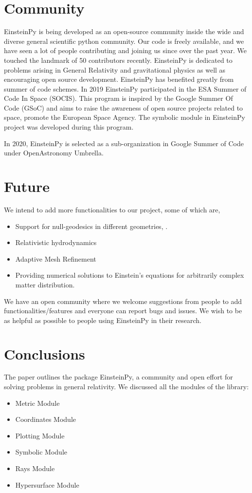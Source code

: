 \documentclass[onecolumn]{aa}
\begin{document}
\section{Community} \label{sec:COMMUNITY}
EinsteinPy is being developed as an open-source community inside the wide and diverse general scientific python community. Our code is freely available, and we have seen a lot of people contributing and joining us since over the past year. We touched the landmark of 50 contributors recently. EinsteinPy is dedicated to problems arising in General Relativity and gravitational physics as well as encouraging open source development. EinsteinPy has benefited greatly from summer of code schemes. In 2019 EinsteinPy participated in the ESA Summer of Code In Space (SOCIS). This program is inspired by the Google Summer Of Code (GSoC) and aims to raise the awareness of open source projects related to space, promote the European Space Agency. The symbolic module in EinsteinPy project was developed during this program.

In 2020, EinsteinPy is selected as a sub-organization in Google Summer of Code under OpenAstronomy Umbrella. 

\section{Future} \label{sec:FUTURE}
We intend to add more functionalities to our project, some of which are, 
\begin{itemize}
\item Support for null-geodesics in different geometries, . 
\item Relativistic hydrodynamics
\item Adaptive Mesh Refinement 
\item Providing numerical solutions to Einstein’s equations for arbitrarily complex matter distribution.
\end{itemize}

We have an open community where we welcome suggestions from people to add functionalities/features and everyone can report bugs and issues. We wish to be as helpful as possible to people using EinsteinPy in their research.


\section{Conclusions}
The paper outlines the package EinsteinPy, a community and open effort for solving problems in general relativity. We discussed all the modules of the library:
\begin{itemize}
\item Metric Module
\item Coordinates Module
\item Plotting Module
\item Symbolic Module
\item Rays Module
\item Hypersurface Module
\end{itemize}
\end{document}
